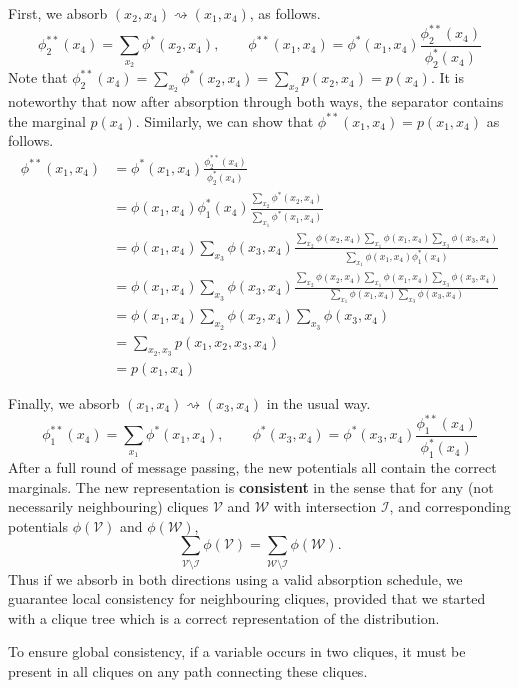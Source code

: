 \documentclass{article}
\begin{document}
First, we absorb $(x_2, x_4) \rightsquigarrow (x_1, x_4)$, as follows.
$$
    \phi_2^{**}(x_4) = \sum_{x_2} \phi^*(x_2, x_4), \qquad \phi^{**}(x_1, x_4) = \phi^*(x_1, x_4) \frac{\phi_2^{**}(x_4)}{\phi_2^*(x_4)}
$$
\noindent Note that $\phi_2^{**}(x_4) = \sum_{x_2} \phi^*(x_2, x_4) = \sum_{x_2} p(x_2, x_4) = p(x_4)$. It is noteworthy that now after absorption through both ways, the separator contains the marginal $p(x_4)$. Similarly, we can show that $\phi^{**}(x_1, x_4) = p(x_1, x_4)$ as follows.
\begin{align*}
    \phi^{**}(x_1, x_4) &= \phi^*(x_1, x_4) \frac{\phi_2^{**}(x_4)}{\phi_2^*(x_4)}\\
    &= \phi(x_1, x_4)\phi_1^*(x_4) \frac{\sum_{x_2} \phi^*(x_2, x_4)}{\sum_{x_1} \phi^*(x_1, x_4)}\\
    &= \phi(x_1, x_4)\sum_{x_3} \phi(x_3, x_4) \frac{\sum_{x_2} \phi(x_2, x_4) \sum_{x_1} \phi(x_1, x_4)\sum_{x_3} \phi(x_3, x_4)}{\sum_{x_1} \phi(x_1, x_4)\phi_1^*(x_4)}\\
    &= \phi(x_1, x_4)\sum_{x_3} \phi(x_3, x_4) \frac{\sum_{x_2} \phi(x_2, x_4) \sum_{x_1} \phi(x_1, x_4)\sum_{x_3} \phi(x_3, x_4)}{\sum_{x_1} \phi(x_1, x_4)\sum_{x_3} \phi(x_3, x_4)}\\
    &= \phi(x_1, x_4) \sum_{x_2} \phi(x_2, x_4) \sum_{x_3} \phi(x_3, x_4) \\
    &= \sum_{x_2, x_3} p(x_1, x_2, x_3, x_4) \\
    &= p(x_1, x_4)
\end{align*}

\noindent Finally, we absorb $(x_1, x_4) \rightsquigarrow (x_3, x_4)$ in the usual way. 
$$
    \phi_1^{**}(x_4) = \sum_{x_1} \phi^*(x_1, x_4), \qquad \phi^{*}(x_3, x_4) = \phi^*(x_3, x_4) \frac{\phi_1^{**}(x_4)}{\phi_1^*(x_4)}
$$
\noindent After a full round of message passing, the new potentials all contain the correct marginals. The new representation is \textbf{consistent} in the sense that for any (not necessarily neighbouring) cliques $\mathcal{V}$ and $\mathcal{W}$ with intersection $\mathcal{I}$, and corresponding potentials $\phi(\mathcal{V})$ and $\phi(\mathcal{W})$, 
$$
    \sum_{\mathcal{V} \text{\textbackslash} \mathcal{I}} \phi(\mathcal{V}) = \sum_{\mathcal{W} \text{\textbackslash} \mathcal{I}} \phi(\mathcal{W}).
$$
\noindent Thus if we absorb in both directions using a valid absorption schedule, we guarantee local consistency for neighbouring cliques, provided that we started with a clique tree which is a correct representation of the distribution. 

To ensure global consistency, if a variable occurs in two cliques, it must be present in all cliques on any path connecting these cliques. 
\end{document}

